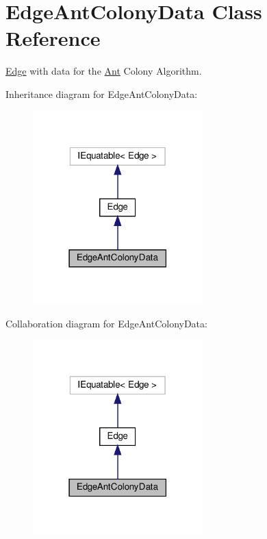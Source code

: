 \hypertarget{classEdgeAntColonyData}{}\section{Edge\+Ant\+Colony\+Data Class Reference}
\label{classEdgeAntColonyData}


\hyperlink{classEdge}{Edge} with data for the \hyperlink{classAnt}{Ant} Colony Algorithm.  




Inheritance diagram for Edge\+Ant\+Colony\+Data\+:\nopagebreak
\begin{figure}[H]
\begin{center}
\leavevmode
\includegraphics[width=186pt]{classEdgeAntColonyData__inherit__graph}
\end{center}
\end{figure}


Collaboration diagram for Edge\+Ant\+Colony\+Data\+:\nopagebreak
\begin{figure}[H]
\begin{center}
\leavevmode
\includegraphics[width=186pt]{classEdgeAntColonyData__coll__graph}
\end{center}
\end{figure}
